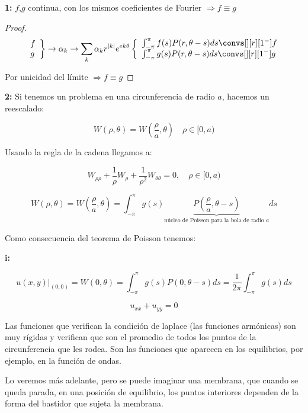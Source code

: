 		\textbf{1:} $f$,$g$ continua, con los mismos coeficientes de Fourier $\Rightarrow f \equiv g$

		\begin{proof}
			\[
				\left. \begin{array}{l}
				f \\
				g
				\end{array} \right\} \rightarrow \alpha_k \rightarrow \sum_k \alpha_k r^{|k|} e^{ek\theta} \left\{ \begin{array}{l}
					\int^{\pi}_{-\pi} f(s) P(r, \theta - s)ds \convs[][r][1^-] f \\
					\int^{\pi}_{-\pi} g(s) P(r, \theta - s)ds \convs[][r][1^-] g
				\end{array} \right.
			\]

			Por unicidad del límite $\Rightarrow f \equiv g$
		\end{proof}


		\textbf{2:} Si tenemos un problema en una circunferencia de radio $a$, hacemos un reescalado:

		\[ W(\rho, \theta) = W(\frac{\rho}{a},\theta) \quad \rho \in [0,a) \]

		Usando la regla de la cadena llegamos a:

		\[W_{\rho \rho} + \frac{1}{\rho} W_\rho + \frac{1}{\rho^2} W_{\theta \theta} = 0, \quad \rho \in [0,a)  \]

		\[W(\rho, \theta) = W(\frac{\rho}{a},\theta) = \int^{\pi}_{-\pi} g(s)\underbrace{P(\frac{\rho}{a},\theta-s)}_{\text{núcleo de Poisson para la bola de radio }a} ds \]

		Como consecuencia del teorema de Poisson tenemos:

		\textbf{i:} 

		 \[u(x,y)|_{(0,0)}  = W(0,\theta) = \int_{-\pi}^\pi g(s) P(0, \theta - s) ds = \frac{1}{2\pi} \int_{-\pi}^\pi g(s) ds \]

		 \[ u_{xx} + u_{yy} = 0\]

		 Las funciones que verifican la condición de laplace (las funciones armónicas) son muy rígidas y verifican que son el promedio de todos los puntos de la circunferencia que les rodea. Son las funciones que aparecen en los equilibrios, por ejemplo, en la función de ondas.

		Lo veremos más adelante, pero se puede imaginar una membrana, que cuando se queda parada, en una posición de equilibrio, los puntos interiores dependen de la forma del bastidor que sujeta la membrana.

